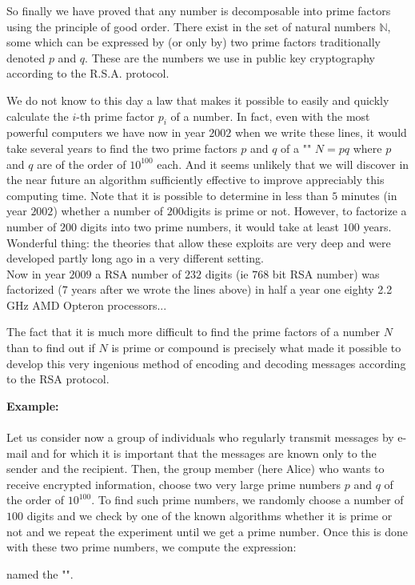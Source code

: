 	So finally we have proved that any number is decomposable into prime factors using the principle of good order. There exist in the set of natural numbers $\mathbb{N}$, some which can be expressed by (or only by) two prime factors traditionally denoted $p$ and $q$. These are the numbers we use in public key cryptography according to the R.S.A. protocol.
	\begin{tcolorbox}[title=Remark,colframe=black,arc=10pt]
	We do not know to this day a law that makes it possible to easily and quickly calculate the $i$-th prime factor $p_i$ of a number. In fact, even with the most powerful computers we have now in year $2002$ when we write these lines, it would take several years to find the two prime factors $p$ and $q$ of a "" $N=pq$ where $p$ and $q$ are of the order of $10^{100}$ each. And it seems unlikely that we will discover in the near future an algorithm sufficiently effective to improve appreciably this computing time. Note that it is possible to determine in less than $5$ minutes (in year $2002$) whether a number of $200 $digits is prime or not. However, to factorize a number of $200$ digits into two prime numbers, it would take at least $100$ years. Wonderful thing: the theories that allow these exploits are very deep and were developed partly long ago in a very different setting.\\
	
	Now in year $2009$ a RSA number of $232$ digits (ie $768$ bit RSA number) was factorized ($7$ years after we wrote the lines above) in half a year one eighty 2.2 GHz AMD Opteron processors...
	\end{tcolorbox}
	The fact that it is much more difficult to find the prime factors of a number $N$ than to find out if $N$ is prime or compound is precisely what made it possible to develop this very ingenious method of encoding and decoding messages according to the RSA protocol.
	\begin{tcolorbox}[colframe=black,colback=white,sharp corners]
	\textbf{{\Large {}}Example:}\\\\
	Let us consider now a group of individuals who regularly transmit messages by e-mail and for which it is important that the messages are known only to the sender and the recipient. Then, the group member (here Alice) who wants to receive encrypted information, choose two very large prime numbers $p$ and $q$ of the order of $10^{100}$. To find such prime numbers, we randomly choose a number of $100$ digits and we check by one of the known algorithms whether it is prime or not and we repeat the experiment until we get a prime number. Once this is done with these two prime numbers, we compute the expression:
	
	named the "".\\
	\end{tcolorbox}
	
